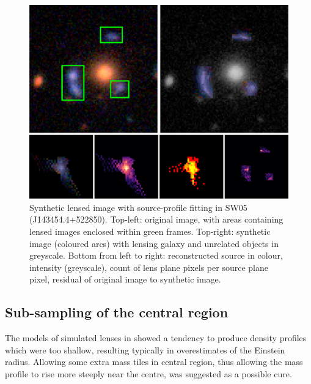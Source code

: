 \begin{figure}
  \includegraphics[width=\linewidth]{img/new_synth_img_detailed}
  \caption{Synthetic lensed image with source-profile fitting in SW05
    (J143454.4+522850). Top-left: original image, with areas
    containing lensed images enclosed within green frames.  Top-right:
    synthetic image (coloured arcs) with lensing galaxy and unrelated
    objects in greyscale.  Bottom from left to right: reconstructed
    source in colour, intensity (greyscale), count of lens plane
    pixels per source plane pixel, residual of original image to
    synthetic image.}
  \label{fig:synthimg}
\end{figure}

\subsection{Sub-sampling of the central region}\label{subsec:hires}

The models of simulated lenses in \cite{2015MNRAS.447.2170K} showed a
tendency to produce density profiles which were too shallow, resulting
typically in overestimates of the Einstein radius. Allowing some extra
mass tiles in central region, thus allowing the mass profile to rise
more steeply near the centre, was suggested as a possible cure.

